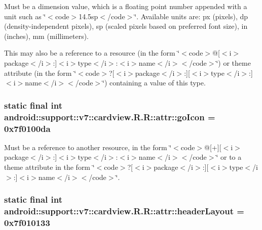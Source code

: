 Must be a dimension value, which is a floating point number appended with a unit such as \char`\"{}$<$code$>$14.5sp$<$/code$>$\char`\"{}. Available units are: px (pixels), dp (density-independent pixels), sp (scaled pixels based on preferred font size), in (inches), mm (millimeters). 

This may also be a reference to a resource (in the form \char`\"{}$<$code$>$@\mbox{[}$<$i$>$package$<$/i$>$:\mbox{]}$<$i$>$type$<$/i$>$:$<$i$>$name$<$/i$>$$<$/code$>$\char`\"{}) or theme attribute (in the form \char`\"{}$<$code$>$?\mbox{[}$<$i$>$package$<$/i$>$:\mbox{]}\mbox{[}$<$i$>$type$<$/i$>$:\mbox{]}$<$i$>$name$<$/i$>$$<$/code$>$\char`\"{}) containing a value of this type. \hypertarget{classandroid_1_1support_1_1v7_1_1cardview_1_1_r_1_1attr_d08b0181953f1a3226a20fbc0b75e062}{
\subsubsection[{goIcon}]{\setlength{\rightskip}{0pt plus 5cm}static final int android::support::v7::cardview.R.R::attr::goIcon = 0x7f0100da}}
\label{classandroid_1_1support_1_1v7_1_1cardview_1_1_r_1_1attr_d08b0181953f1a3226a20fbc0b75e062}


Must be a reference to another resource, in the form \char`\"{}$<$code$>$@\mbox{[}+\mbox{]}\mbox{[}$<$i$>$package$<$/i$>$:\mbox{]}$<$i$>$type$<$/i$>$:$<$i$>$name$<$/i$>$$<$/code$>$\char`\"{} or to a theme attribute in the form \char`\"{}$<$code$>$?\mbox{[}$<$i$>$package$<$/i$>$:\mbox{]}\mbox{[}$<$i$>$type$<$/i$>$:\mbox{]}$<$i$>$name$<$/i$>$$<$/code$>$\char`\"{}. \hypertarget{classandroid_1_1support_1_1v7_1_1cardview_1_1_r_1_1attr_512d281a9e164d20e005cbe949e62e39}{
\subsubsection[{headerLayout}]{\setlength{\rightskip}{0pt plus 5cm}static final int android::support::v7::cardview.R.R::attr::headerLayout = 0x7f010133}}
\label{classandroid_1_1support_1_1v7_1_1cardview_1_1_r_1_1attr_512d281a9e164d20e005cbe949e62e39}


